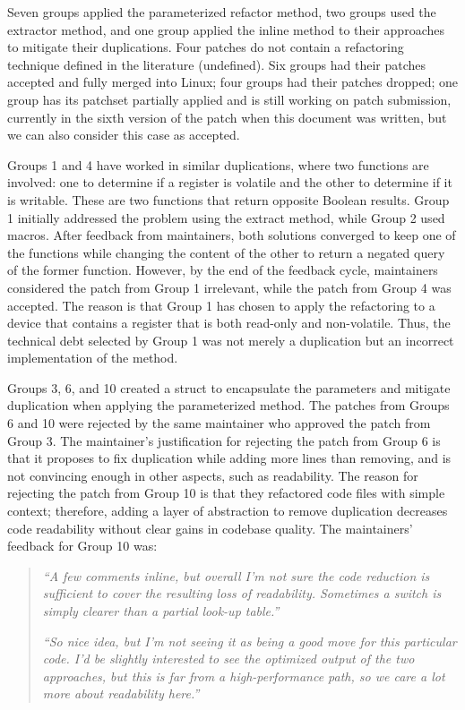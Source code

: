 \documentclass[12pt]{article}
\begin{document}
Seven groups applied the parameterized refactor method, two groups used the extractor method, and one group applied the inline method to their approaches to mitigate their duplications. Four patches do not contain a refactoring technique defined in the literature (undefined). Six groups had their patches accepted and fully merged into Linux; four groups had their patches dropped; one group has its patchset partially applied and is still working on patch submission, currently in the sixth version of the patch when this document was written, but we can also consider this case as accepted.

Groups 1 and 4 have worked in similar duplications, where two functions are involved: one to determine if a register is volatile and the other to determine if it is writable. These are two functions that return opposite Boolean results. Group 1 initially addressed the problem using the extract method, while Group 2 used macros. After feedback from maintainers, both solutions converged to keep one of the functions while changing the content of the other to return a negated query of the former function. However, by the end of the feedback cycle, maintainers considered the patch from Group 1 irrelevant, while the patch from Group 4 was accepted. The reason is that Group 1 has chosen to apply the refactoring to a device that contains a register that is both read-only and non-volatile. Thus, the technical debt selected by Group 1 was not merely a duplication but an incorrect implementation of the method.

Groups 3, 6, and 10 created a struct to encapsulate the parameters and mitigate duplication when applying the parameterized method. The patches from Groups 6 and 10 were rejected by the same maintainer who approved the patch from Group 3. The maintainer's justification for rejecting the patch from Group 6 is that it proposes to fix duplication while adding more lines than removing, and is not convincing enough in other aspects, such as readability. The reason for rejecting the patch from Group 10 is that they refactored code files with simple context; therefore, adding a layer of abstraction to remove duplication decreases code readability without clear gains in codebase quality. The maintainers' feedback for Group 10 was:
\begin{quote}

\textit{``A few comments inline, but overall I'm not sure the code reduction is sufficient to cover the resulting loss of readability. Sometimes a switch is simply clearer than a partial look-up table.''}

\textit{``So nice idea, but I'm not seeing it as being a good move for this particular code. I'd be slightly interested to see the optimized output of the two approaches, but this is far from a high-performance path, so we care a lot more about readability here.''} 
\end{quote}
\end{document}
